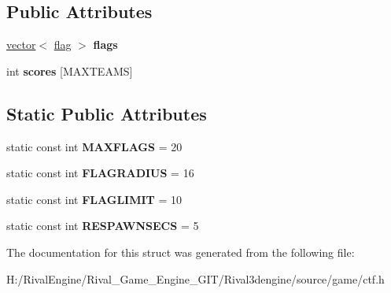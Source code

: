 \subsection*{Public Attributes}
\begin{DoxyCompactItemize}
\item 
\mbox{\label{structctfclientmode_a54da7b616182daded9fb8e82267b481e}} 
\hyperlink{structvector}{vector}$<$ \hyperlink{structctfclientmode_1_1flag}{flag} $>$ {\bfseries flags}
\item 
\mbox{\label{structctfclientmode_a00ccd042ee47e728f613671bb40119d1}} 
int {\bfseries scores} \mbox{[}M\+A\+X\+T\+E\+A\+MS\mbox{]}
\end{DoxyCompactItemize}
\subsection*{Static Public Attributes}
\begin{DoxyCompactItemize}
\item 
\mbox{\label{structctfclientmode_af2efca7d9ca5b0b4eaeb4930b0f436c2}} 
static const int {\bfseries M\+A\+X\+F\+L\+A\+GS} = 20
\item 
\mbox{\label{structctfclientmode_a9ce81e5ddf40a4829f25635e747673a3}} 
static const int {\bfseries F\+L\+A\+G\+R\+A\+D\+I\+US} = 16
\item 
\mbox{\label{structctfclientmode_ac4dc1e4b9e23e4a1be6a24deee26b862}} 
static const int {\bfseries F\+L\+A\+G\+L\+I\+M\+IT} = 10
\item 
\mbox{\label{structctfclientmode_abe294eee06da4ef0c433988ef751c4a5}} 
static const int {\bfseries R\+E\+S\+P\+A\+W\+N\+S\+E\+CS} = 5
\end{DoxyCompactItemize}


The documentation for this struct was generated from the following file\+:\begin{DoxyCompactItemize}
\item 
H\+:/\+Rival\+Engine/\+Rival\+\_\+\+Game\+\_\+\+Engine\+\_\+\+G\+I\+T/\+Rival3dengine/source/game/ctf.\+h\end{DoxyCompactItemize}
